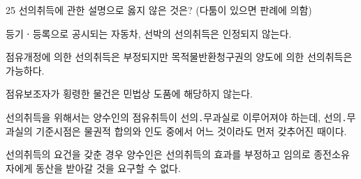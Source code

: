\begin{question}{25}
선의취득에 관한 설명으로 옳지 않은 것은? (다툼이 있으면 판례에 의함)
\begin{choices}
  \item 등기ㆍ등록으로 공시되는 자동차, 선박의 선의취득은 인정되지 않는다.
  \item 점유개정에 의한 선의취득은 부정되지만 목적물반환청구권의 양도에 의한 선의취득은 가능하다.
  \item 점유보조자가 횡령한 물건은 민법상 도품에 해당하지 않는다.
  \item 선의취득을 위해서는 양수인의 점유취득이 선의․무과실로 이루어져야 하는데, 선의․무과실의 기준시점은 물권적 합의와 인도 중에서 어느 것이라도 먼저 갖추어진 때이다.
  \item 선의취득의 요건을 갖춘 경우 양수인은 선의취득의 효과를 부정하고 임의로 종전소유자에게 동산을 받아갈 것을 요구할 수 없다.
\end{choices}
\end{question}
